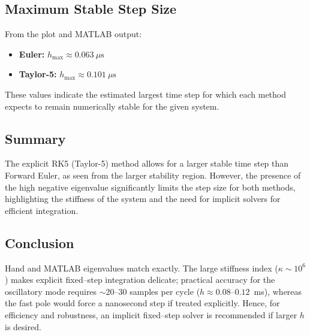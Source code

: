 \subsection*{Maximum Stable Step Size}
From the plot and MATLAB output:
\begin{itemize}
    \item \textbf{Euler:} $h_\text{max} \approx 0.063~\mu\text{s}$
    \item \textbf{Taylor-5:} $h_\text{max} \approx 0.101~\mu\text{s}$
\end{itemize}
These values indicate the estimated largest time step for which each method expects to remain numerically stable for the given system.

\subsection*{Summary}
The explicit RK5 (Taylor-5) method allows for a larger stable time step than Forward Euler, as seen from the larger stability region. However, the presence of the high negative eigenvalue significantly limits the step size for both methods, highlighting the stiffness of the system and the need for implicit solvers for efficient integration.

\subsection*{Conclusion}
Hand and MATLAB eigenvalues match exactly. The large stiffness index
($\kappa\!\sim\!10^{6}$) makes explicit fixed–step integration delicate;
practical accuracy for the oscillatory mode requires $\sim$20–30 samples per
cycle ($h\approx 0.08$–$0.12$~ms), whereas the fast pole would force a
nanosecond step if treated explicitly. Hence, for efficiency and robustness,
an implicit fixed–step solver is recommended if larger $h$ is desired.



